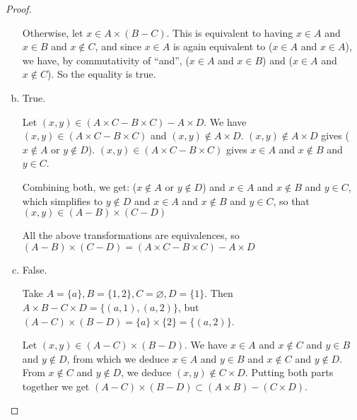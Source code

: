 \documentclass[11pt,a4paper,twoside]{article}
\theoremstyle{definition}
\begin{document}
\begin{proof}
\begin{enumerate}[(a)]
  Otherwise, let $x \in A \times (B - C)$. This is equivalent to having $x \in A$ and $x \in B$ and $x \notin C$, and since $x \in A$ is again equivalent to ($x \in A$ and $x \in A$), we have,
  by commutativity of ``and'', ($x \in A$ and $x \in B$) and ($x \in A$ and $x \notin C$). So the equality is true.

\item True.

  Let $(x, y) \in (A \times C - B \times C) - A \times D$. We have $(x, y) \in (A \times C - B \times C)$ and $(x, y) \notin A \times D$.
  $(x, y) \notin A \times D$ gives ($x \notin A$ or $y \notin D$).
  $(x, y) \in (A \times C - B \times C)$ gives $x \in A$ and $x \notin B$ and $y \in C$.

  Combining both, we get:
  ($x \notin A$ or $y \notin D$) and $x \in A$ and $x \notin B$ and $y \in C$, which simplifies to
  $y \notin D$ and $x \in A$ and $x \notin B$ and $y \in C$, so that
  $(x, y) \in (A - B) \times (C - D)$

  All the above transformations are equivalences, so $(A - B) \times (C - D) = (A \times C - B \times C) - A \times D$

\item False.

  Take $A = \{ a \}, B = \{ 1, 2 \}, C = \varnothing, D = \{ 1 \}$. Then $A \times B - C \times D = \{ (a, 1), (a, 2) \}$,
  but $(A - C) \times (B - D) = \{ a \} \times \{ 2 \} = \{ (a, 2) \}$.

  Let $(x, y) \in (A - C) \times (B - D)$. We have $x \in A$ and $x \notin C$ and $y \in B$ and $y \notin D$, from which we deduce
  $x \in A$ and $y \in B$ and $x \notin C$ and $y \notin D$. From $x \notin C$ and $y \notin D$, we deduce $(x, y) \notin C \times D$.
  Putting both parts together we get $(A - C) \times (B - D) \subset (A \times B) - (C \times D)$.

\end{enumerate}
\end{proof}
\end{document}
